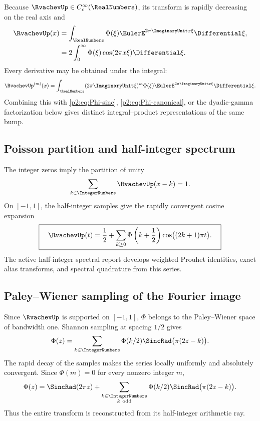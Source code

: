 \documentclass[11pt]{article}
\theoremstyle{definition}
\theoremstyle{remark}
\begin{document}
Because $\RvachevUp\in C_c^\infty(\RealNumbers)$, its transform is rapidly decreasing on the real axis and
\begin{align}
 \RvachevUp(x)
 &=\int_{\RealNumbers}\Phi(\xi)\EulerE^{2\pi\ImaginaryUnit x\xi}\Differential\xi,           \label{p2:eq:up-inversion}\\
 &=2\int_0^\infty\Phi(\xi)\cos(2\pi x\xi)\Differential\xi.       \label{p2:eq:up-cos-integral}
\end{align}
Every derivative may be obtained under the integral:
\begin{equation}
 \RvachevUp^{(m)}(x)=\int_{\RealNumbers}(2\pi\ImaginaryUnit\xi)^m
 \Phi(\xi)\EulerE^{2\pi\ImaginaryUnit x\xi}\Differential\xi.                   \label{p2:eq:up-derivative-Fourier}
\end{equation}
Combining this with \eqref{p2:eq:Phi-sinc}, \eqref{p2:eq:Phi-canonical}, or the dyadic-gamma
factorization below gives distinct integral--product representations of the same bump.

\subsection{Poisson partition and half-integer spectrum}

The integer zeros imply the partition of unity
\begin{equation}
 \sum_{k\in\IntegerNumbers}\RvachevUp(x-k)=1.                                \label{p2:eq:partition-unity}
\end{equation}
On $[-1,1]$, the half-integer samples give the rapidly convergent cosine expansion
\begin{equation}
 \boxed{\quad
 \RvachevUp(t)=\frac12+\sum_{k\ge0}
 \Phi\left(k+\frac12\right)
 \cos\bigl((2k+1)\pi t\bigr).
 \quad}                                                  \label{p2:eq:up-half-cosine}
\end{equation}
The active half-integer spectral report develops weighted Prouhet identities, exact alias
transforms, and spectral quadrature from this series.

\subsection{Paley--Wiener sampling of the Fourier image}

Since $\RvachevUp$ is supported on $[-1,1]$, $\Phi$ belongs to the Paley--Wiener space of bandwidth
one.  Shannon sampling at spacing $1/2$ gives
\begin{equation}
 \Phi(z)=\sum_{k\in\IntegerNumbers}\Phi(k/2)
 \SincRad\bigl(\pi(2z-k)\bigr).                             \label{p2:eq:Phi-Shannon}
\end{equation}
The rapid decay of the samples makes the series locally uniformly and absolutely
convergent.  Since $\Phi(m)=0$ for every nonzero integer $m$,
\begin{equation}
 \Phi(z)=\SincRad(2\pi z)+
 \sum_{\substack{k\in\IntegerNumbers\\k\ \mathrm{odd}}}
 \Phi(k/2)\SincRad\bigl(\pi(2z-k)\bigr).                   \label{p2:eq:Phi-Shannon-odd}
\end{equation}
Thus the entire transform is reconstructed from its half-integer arithmetic ray.
\end{document}
